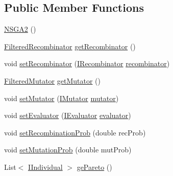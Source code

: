 \subsection*{Public Member Functions}
\begin{DoxyCompactItemize}
\item 
\hyperlink{classnet_1_1sf_1_1jclec_1_1algorithm_1_1multiobjective_1_1_n_s_g_a2_a49c20036648ce0426aea2138d5580396}{N\-S\-G\-A2} ()
\item 
\hyperlink{classnet_1_1sf_1_1jclec_1_1base_1_1_filtered_recombinator}{Filtered\-Recombinator} \hyperlink{classnet_1_1sf_1_1jclec_1_1algorithm_1_1multiobjective_1_1_n_s_g_a2_a902635c2eae519f615bd730c62a58305}{get\-Recombinator} ()
\item 
void \hyperlink{classnet_1_1sf_1_1jclec_1_1algorithm_1_1multiobjective_1_1_n_s_g_a2_abc1a1ea206e6790f730abe51d09bcbdd}{set\-Recombinator} (\hyperlink{interfacenet_1_1sf_1_1jclec_1_1_i_recombinator}{I\-Recombinator} \hyperlink{classnet_1_1sf_1_1jclec_1_1algorithm_1_1multiobjective_1_1_n_s_g_a2_a54d8a587946b6b3f1c11a348a25d85a9}{recombinator})
\item 
\hyperlink{classnet_1_1sf_1_1jclec_1_1base_1_1_filtered_mutator}{Filtered\-Mutator} \hyperlink{classnet_1_1sf_1_1jclec_1_1algorithm_1_1multiobjective_1_1_n_s_g_a2_ace863cbd03a660fd456367c012815a8c}{get\-Mutator} ()
\item 
void \hyperlink{classnet_1_1sf_1_1jclec_1_1algorithm_1_1multiobjective_1_1_n_s_g_a2_a22b878ea121bf8660174035f9f92cc1e}{set\-Mutator} (\hyperlink{interfacenet_1_1sf_1_1jclec_1_1_i_mutator}{I\-Mutator} \hyperlink{classnet_1_1sf_1_1jclec_1_1algorithm_1_1multiobjective_1_1_n_s_g_a2_a1823d623a933ef194564311b162e7fbd}{mutator})
\item 
void \hyperlink{classnet_1_1sf_1_1jclec_1_1algorithm_1_1multiobjective_1_1_n_s_g_a2_a472981b7bdb14fa467f53d34f6e26cab}{set\-Evaluator} (\hyperlink{interfacenet_1_1sf_1_1jclec_1_1_i_evaluator}{I\-Evaluator} \hyperlink{classnet_1_1sf_1_1jclec_1_1algorithm_1_1_population_algorithm_a9f6c1c4e616e67830292a672907be134}{evaluator})
\item 
void \hyperlink{classnet_1_1sf_1_1jclec_1_1algorithm_1_1multiobjective_1_1_n_s_g_a2_a0490c46d971171b7f2bf31ff9c4e4abd}{set\-Recombination\-Prob} (double rec\-Prob)
\item 
void \hyperlink{classnet_1_1sf_1_1jclec_1_1algorithm_1_1multiobjective_1_1_n_s_g_a2_a8c723b78b8bab05b25013b0d2d22803c}{set\-Mutation\-Prob} (double mut\-Prob)
\item 
List$<$ \hyperlink{interfacenet_1_1sf_1_1jclec_1_1_i_individual}{I\-Individual} $>$ \hyperlink{classnet_1_1sf_1_1jclec_1_1algorithm_1_1multiobjective_1_1_n_s_g_a2_a32dc78a2c96dbb3410f951714ed9a338}{ge\-Pareto} ()

\end{DoxyCompactItemize}
